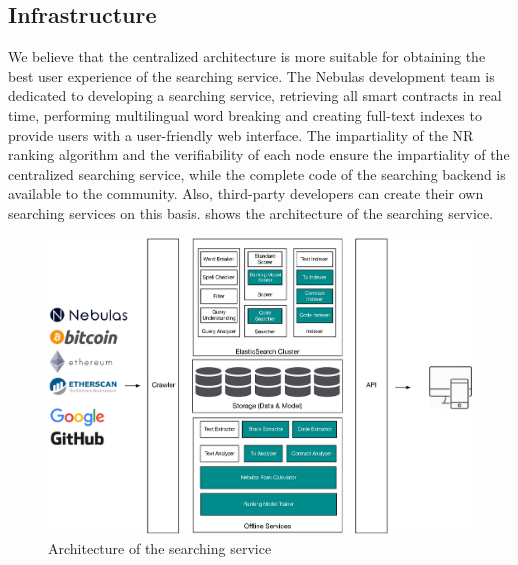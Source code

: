 \subsection{Infrastructure}

We believe that the centralized architecture is more suitable for obtaining the best user experience of the searching service. The Nebulas development team is dedicated to developing a searching service, retrieving all smart contracts in real time, performing multilingual word breaking and creating full-text indexes to provide users with a user-friendly web interface. The impartiality of the NR ranking algorithm and the verifiability of each node ensure the impartiality of the centralized searching service, while the complete code of the searching backend is available to the community. Also, third-party developers can create their own searching services on this basis.  shows the architecture of the searching service.


\begin{figure}[h]
\centering
\includegraphics[width=16cm]{./figs/search-arch-new}
\caption{Architecture of the searching service}
\label{fig:search-arch}
\end{figure}

